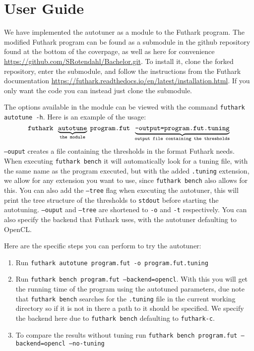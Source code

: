 \section{User Guide}
We have implemented the autotuner as a module to the Futhark program.
The modified Futhark program can be found as a submodule in the github repository found at the bottom of the
coverpage, as well as here for convenience
\url{https://github.com/SRotendahl/Bachelor.git}. To install it, clone the
forked repository, enter the submodule, and follow the instructions from the Futhark documentation
\url{https://futhark.readthedocs.io/en/latest/installation.html}. If you only
want the code you can instead just clone the submodule.

The options available in the module can be viewed with the command 
\texttt{futhark autotune -h}. Here is an example of the usage:
$$\text{\texttt{futhark }}\underbrace{\texttt{autotune}}_\text{\texttt{the module}}\;
\text{\texttt{program.fut }} \underbrace{\texttt{--output=program.fut.tuning}}_
\text{\texttt{output file containing the thresholds}}$$
\texttt{--ouput} creates a file containing the thresholds in the format Futhark needs. 
When executing \texttt{futhark bench} it will automatically look for a tuning file, 
with the same name as the program executed, but with the added \texttt{.tuning} extension, 
we allow for any extension you want to use, since \texttt{futhark bench} also allows for this.
You can also add the \texttt{--tree} flag when executing the autotuner, this will print the
tree structure of the thresholds to \texttt{stdout} before starting the autotuning. 
\texttt{--ouput} and \texttt{--tree} are shortened to \texttt{-o} and \texttt{-t} respectively.
You can also specify the backend that Futhark uses, with the autotuner defaulting to OpenCL.

Here are the specific steps you can perform to try the autotuner:
\begin{enumerate}
\item Run \texttt{futhark autotune program.fut -o program.fut.tuning}
\item Run \texttt{futhark bench program.fut --backend=opencl}. With this you will get the 
running time of the program using the autotuned parameters, due note that \texttt{futhark bench} searches for the \texttt{.tuning} file in the current working directory so if it is not in there a path to it should be specified. We specify the backend here due to \texttt{futhark bench} defaulting to \texttt{futhark-c}.
\item To compare the results without tuning run \texttt{futhark bench program.fut --backend=opencl --no-tuning}
\end{enumerate}
